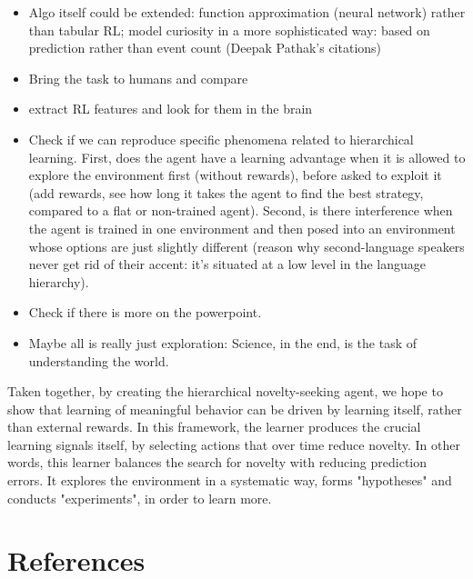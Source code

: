 \documentclass{article}
\begin{document}
\begin{itemize}
	\item Algo itself could be extended: function approximation (neural network) rather than tabular RL; model curiosity in a more sophisticated way: based on prediction rather than event count (Deepak Pathak's citations)
	\item Bring the task to humans and compare
	\item extract RL features and look for them in the brain
	\item Check if we can reproduce specific phenomena related to hierarchical learning. First, does the agent have a learning advantage when it is allowed to explore the environment first (without rewards), before asked to exploit it (add rewards, see how long it takes the agent to find the best strategy, compared to a flat or non-trained agent). Second, is there interference when the agent is trained in one environment and then posed into an environment whose options are just slightly different (reason why second-language speakers never get rid of their accent: it's situated at a low level in the language hierarchy).
	\item Check if there is more on the powerpoint.
	\item Maybe all is really just exploration: Science, in the end, is the task of understanding the world.
\end{itemize}

Taken together, by creating the hierarchical novelty-seeking agent, we hope to show that learning of meaningful behavior can be driven by learning itself, rather than external rewards. In this framework, the learner produces the crucial learning signals itself, by selecting actions that over time reduce novelty. In other words, this learner balances the search for novelty with reducing prediction errors. It explores the environment in a systematic way, forms "hypotheses" and conducts "experiments", in order to learn more. 

\section*{References}

\printbibliography
\end{document}
